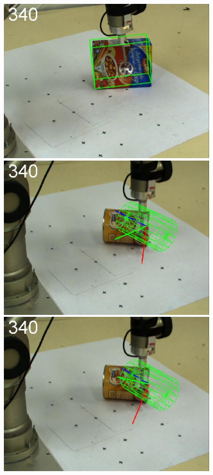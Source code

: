 \begin{figure}[htbp]
{\includegraphics[width=\imgAXwid]{images/A2_2exp_87_5}
\includegraphics[width=\imgAXwid]{images/A3_2exp_39_5}
\includegraphics[width=\imgAXwid]{images/A3_LWPR1_39_5}
}
\end{figure}
